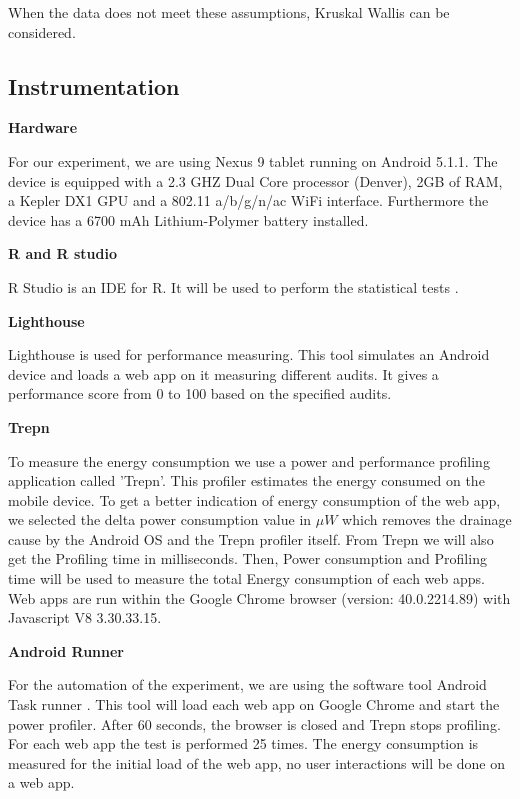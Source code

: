 When the data does not meet these assumptions, Kruskal Wallis can be considered. \newline

	
\subsection{Instrumentation}

\textbf{Hardware}

For our experiment, we are using Nexus 9 tablet running on Android 5.1.1. The device is equipped with a 2.3 GHZ Dual Core processor (Denver), 2GB of RAM, a Kepler DX1 GPU and a 802.11 a/b/g/n/ac WiFi interface. Furthermore the device has a 6700 mAh Lithium-Polymer battery installed. \newline

\textbf{R and R studio}

R Studio is an IDE for R. It will be used to perform the statistical tests \cite{WEBSITE:14}. \newline

\textbf{Lighthouse}

Lighthouse is used for performance measuring. This tool simulates an Android device and loads a web app on it measuring different audits. It gives a performance score from 0 to 100 based on the specified audits.
 \newpage

\textbf{Trepn}

To measure the energy consumption we use a power and performance profiling application called 'Trepn'. This profiler estimates the energy consumed on the mobile device. To get a better indication of energy consumption of the web app, we selected the delta power consumption value in $\mu W$ which removes the drainage cause by the Android OS and the Trepn profiler itself. From Trepn we will also get the Profiling time in milliseconds. Then, Power consumption and Profiling time will be used to measure the total Energy consumption of each web apps. Web apps are run within the Google Chrome browser (version: 40.0.2214.89) with Javascript V8 3.30.33.15. \newline

\textbf{Android Runner}

For the automation of the experiment, we are using the software tool Android Task runner \cite{WEBSITE:10}. This tool will load each web app on Google Chrome and start the power profiler. After 60 seconds, the browser is closed and Trepn stops profiling. For each web app the test is performed 25 times. The energy consumption is measured for the initial load of the web app, no user interactions will be done on a web app.
\newline


